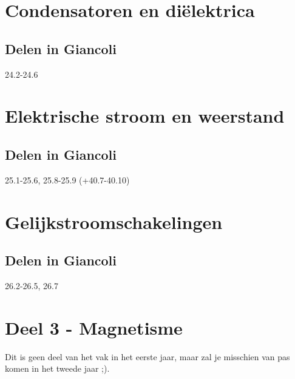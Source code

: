 \documentclass[12pt,a4paper]{article}
\begin{document}
	\section{Condensatoren en diëlektrica}
	\subsection{Delen in Giancoli}
	24.2-24.6
	\section{Elektrische stroom en weerstand}
	\subsection{Delen in Giancoli}
	25.1-25.6, 25.8-25.9 (+40.7-40.10)
	\section{Gelijkstroomschakelingen}
	\subsection{Delen in Giancoli}
	26.2-26.5, 26.7
	\newpage
	\section{Deel 3 - Magnetisme}
	Dit is geen deel van het vak in het eerste jaar, maar zal je misschien van pas komen in het tweede jaar ;).
\end{document}
